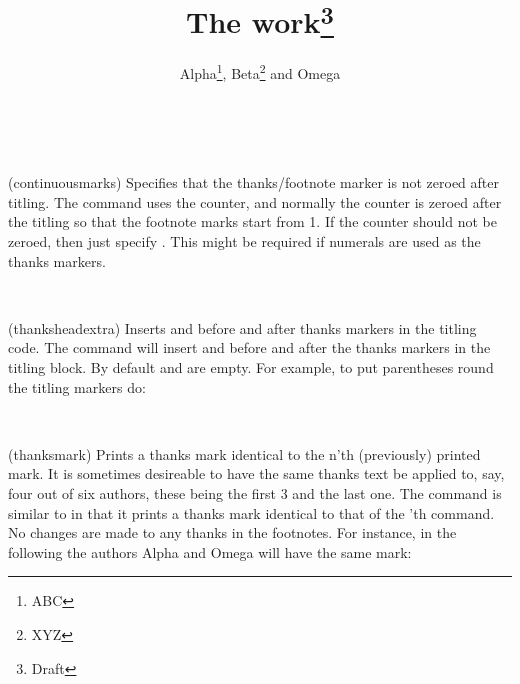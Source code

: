 \begin{syntax}
\cmd{\continuousmarks} \\
\end{syntax}
\glossary(continuousmarks)%
  {}%
  {Specifies that the thanks/footnote marker is not zeroed after titling.}
The \cmd{\thanks} command uses the  counter, 
and normally the counter
is zeroed after the titling so that the footnote marks start from 1.
If the counter should not be zeroed, then just specify 
\cmd{\continuousmarks}.
This might be required if numerals are used as the thanks markers.

\begin{syntax}
\cmd{\thanksheadextra} \\
\end{syntax}
\glossary(thanksheadextra)%
  {}%
  {Inserts  and  before and after thanks markers
   in the titling code.}
The \cmd{\thanksheadextra} command will insert
 and  before and after the thanks markers in the
titling block. By default  and  are empty.
For example, to put parentheses round the titling markers do:
\begin{lcode}
\thanksheadextra{(}{)}
\end{lcode}


\begin{syntax}
\cmd{\thanksmark} \\
\end{syntax}
\glossary(thanksmark)%
  {}%
  {Prints a thanks mark identical to the n'th (previously) printed mark.}
It is sometimes desireable to have the same thanks text be applied to,
say, four out of six authors, these being the first 3 and the last one.
The command \cmd{\thanksmark} is similar to 
\cmd{\footnotemark} in that it prints a thanks mark identical
to that of the 'th  \cmd{\thanks} command. No changes are made
to any thanks in the footnotes. For instance, in the following
the authors Alpha and Omega will have the same mark:
\begin{lcode}
\title{The work\thanks{Draft}}
\author{Alpha\thanks{ABC},
        Beta\thanks{XYZ} and 
        Omega} 
\maketitle
\end{lcode}

